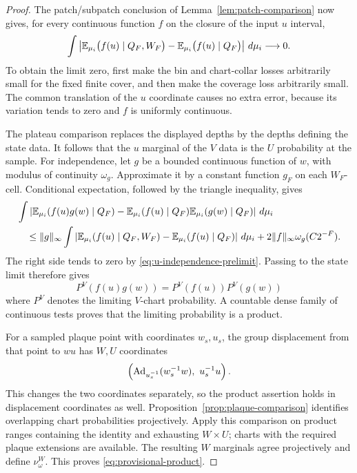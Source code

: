 \begin{proof}
The patch/subpatch conclusion of
Lemma~\ref{lem:patch-comparison} now gives, for every continuous
function \(f\) on the closure of the input \(u\) interval,
\begin{equation}\label{eq:u-independence-prelimit}
 \int
 \left|
   \mathbb E_{\mu_i}\bigl(f(u)\mid Q_F,W_F\bigr)
    -\mathbb E_{\mu_i}\bigl(f(u)\mid Q_F\bigr)
 \right|\,\mathop{}\!d\mu_i
                         \longrightarrow0.
\end{equation}
To obtain the limit zero, first make the bin and chart-collar losses
arbitrarily small for the fixed finite cover, and then make the
coverage loss arbitrarily small.  The common translation of the
\(u\) coordinate causes no extra error, because its variation tends
to zero and \(f\) is uniformly continuous.

The plateau comparison replaces the displayed depths by the depths
defining the state data.  It follows that the \(u\) marginal of the
\(V\) data is the \(U\) probability at the sample.  For independence,
let \(g\) be a bounded continuous function of \(w\), with modulus
of continuity \(\omega_g\).  Approximate it by a constant
function \(g_F\) on each \(W_F\)-cell.  Conditional expectation,
followed by the triangle inequality, gives
\[
\begin{split}
 &\int\left|
   \mathbb E_{\mu_i}(f(u)g(w)\mid Q_F)
     -\mathbb E_{\mu_i}(f(u)\mid Q_F)\mathbb E_{\mu_i}(g(w)\mid Q_F)
                  \right|\,\mathop{}\!d\mu_i\\
 &\quad\le
 \|g\|_\infty
 \int\left|
   \mathbb E_{\mu_i}(f(u)\mid Q_F,W_F)
       -\mathbb E_{\mu_i}(f(u)\mid Q_F)
       \right|\,\mathop{}\!d\mu_i
       +2\|f\|_\infty\omega_g(C2^{-F}).
\end{split}
\]
The right side tends to zero by
\eqref{eq:u-independence-prelimit}.  Passing to the state limit
therefore gives
\[
 P^V(f(u)g(w))=P^V(f(u))P^V(g(w))
\]
where \(P^V\) denotes the limiting \(V\)-chart probability.
A countable dense family of continuous
tests proves that the limiting probability is a product.

For a sampled plaque point with coordinates \(w_s,u_s\), the group
displacement from that point to \(wu\) has \(W,U\) coordinates
\begin{equation}\label{eq:product-displacement}
 \left(\operatorname{Ad}_{u_s^{-1}}(w_s^{-1}w),\ u_s^{-1}u\right).
\end{equation}
This changes the two coordinates separately, so the product
assertion holds in displacement coordinates as well.
Proposition~\ref{prop:plaque-comparison} identifies overlapping
chart probabilities projectively.  Apply this comparison on
product ranges containing the identity and exhausting \(W\times
U\); charts with the required plaque extensions are available.
The resulting \(W\) marginals agree projectively and define
\(\nu^W_\omega\).  This proves \eqref{eq:provisional-product}.
\end{proof}

